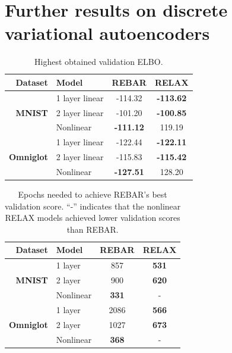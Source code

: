 \documentclass{article}
\begin{document}
\section{Further results on discrete variational autoencoders}
\label{extra vae results}

\begin{table}[h]
\centering
\begin{tabular}{r l | c c} 
  Dataset & Model & REBAR & RELAX \\\midrule
 & 1 layer linear  & -114.32 & \textbf{-113.62} \\ 
\textbf{MNIST} & 2 layer linear  & -101.20 & \textbf{-100.85}\\
& Nonlinear & \textbf{-111.12} & 119.19 \\ \midrule
 & 1 layer linear & -122.44 & \textbf{-122.11} \\ 
\textbf{Omniglot}& 2 layer linear & -115.83 & \textbf{-115.42}\\
& Nonlinear& \textbf{-127.51} & 128.20
\end{tabular}
\caption{Highest obtained validation ELBO.}
\label{tab:vae val}
\end{table}


\begin{table}[h]
\centering
\begin{tabular}{r l | c c} 
 Dataset & Model  & REBAR & RELAX \\\midrule
 & 1 layer  & 857 & \textbf{531} \\ 
\textbf{MNIST} & 2 layer  & 900 & \textbf{620} \\
& Nonlinear & \textbf{331} & - \\
\midrule
& 1 layer & 2086 & \textbf{566} \\ 
\textbf{Omniglot}  & 2 layer & 1027 & \textbf{673}\\
& Nonlinear & \textbf{368} & - 
\end{tabular}
\caption{Epochs needed to achieve REBAR's best validation score. ``-'' indicates that the nonlinear RELAX models achieved lower validation scores than REBAR.}
\label{tab:vae epochs}
\end{table}
\end{document}
